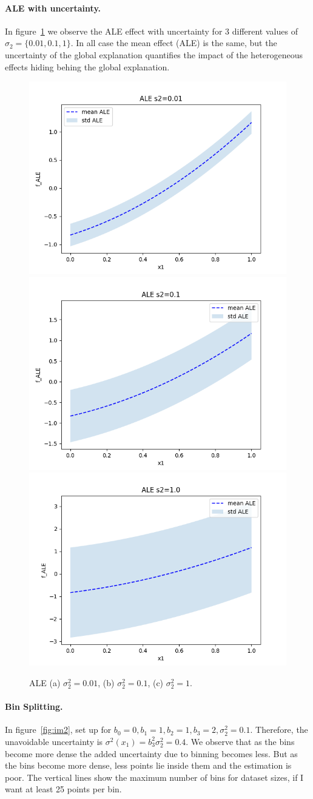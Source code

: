 \documentclass{article}
\begin{document}
\paragraph{ALE with uncertainty.}

In figure~\ref{fig:bullet-1-im-3} we observe the ALE effect with
uncertainty for 3 different values of \(\sigma_2 = \{0.01, 0.1,
1\}\). In all case the mean effect (ALE) is the same, but the
uncertainty of the global explanation quantifies the impact of the
heterogeneous effects hiding behing the global explanation.

\begin{figure}[!h]
  \centering
  \includegraphics[width=.32\linewidth]{./example_gromping_paper/ALE_gt_s2_0_01.png}
  \includegraphics[width=.32\linewidth]{./example_gromping_paper/ALE_gt_s2_0_1.png}
  \includegraphics[width=.32\linewidth]{./example_gromping_paper/ALE_gt_s2_1_0.png}
  \caption{ALE (a) \(\sigma_2^2 = 0.01\), (b) \(\sigma_2^2 = 0.1\), (c) \(\sigma_2^2 = 1.\)}
  \label{fig:bullet-1-im-3}
\end{figure}


\paragraph{Bin Splitting.}

In figure~\ref{fig:im2}, set up for
\(b_0=0, b_1=1, b_2=1, b_3=2, \sigma_2^2 = 0.1\). Therefore, the
unavoidable uncertainty is \(\sigma^2(x_1) = b_3^2 \sigma_2^2 =
0.4\). We observe that as the bins become more dense the added
uncertainty due to binning becomes less. But as the bins become more
dense, less points lie inside them and the estimation is poor. The
vertical lines show the maximum number of bins for dataset sizes, if I
want at least 25 points per bin.
\end{document}
